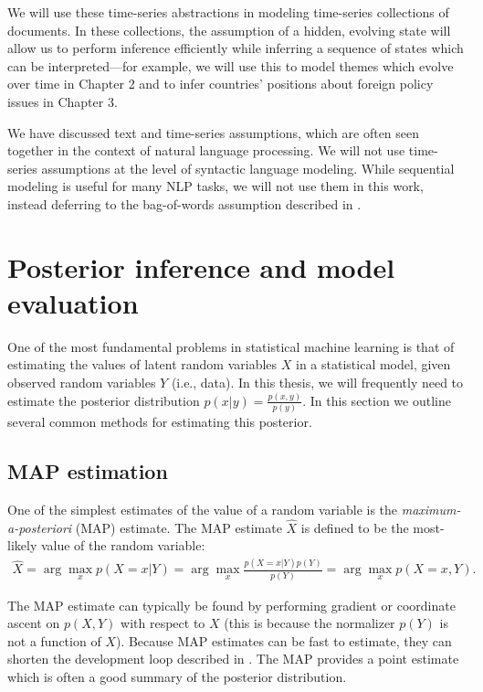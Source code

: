 We will use these time-series abstractions in modeling time-series
collections of documents.  In these collections, the assumption of a
hidden, evolving state will allow us to perform inference efficiently
while inferring a sequence of states which can be interpreted---for
example, we will use this to model themes which evolve over time in
Chapter 2 and to infer countries' positions about foreign policy
issues in Chapter 3.

We have discussed text and time-series assumptions, which are often
seen together in the context of natural language processing.  We will
not use time-series assumptions at the level of syntactic language
modeling.  While sequential modeling is useful for many NLP tasks, we
will not use them in this work, instead deferring to the bag-of-words
assumption described in .


\section{Posterior inference and model evaluation}
One of the most fundamental problems in statistical machine learning
is that of estimating the values of latent random variables $X$ in a
statistical model, given observed random variables $Y$ (i.e., data).
In this thesis, we will frequently need to estimate the posterior distribution
$p(x | y) = \frac{p(x, y)}{p(y)}$.  In this section we outline
several common methods for estimating this posterior.

\subsection{MAP estimation}
One of the simplest estimates of the value of a random variable is the
\emph{maximum-a-posteriori} (MAP) estimate.  The MAP estimate $\hat X$
is defined to be the most-likely value of the random variable:
\begin{align}
  \hat X = \arg \max_x p(X=x | Y) = \arg \max_x \frac{p(X=x | Y) p(Y)}{p(Y)} = \arg \max_x p(X=x, Y).
\end{align}

The MAP estimate can typically be found by performing gradient or
coordinate ascent on $p(X, Y)$ with respect to $X$ (this is because
the normalizer $p(Y)$ is not a function of $X$).  Because MAP
estimates can be fast to estimate, they can shorten the development
loop described in . The MAP provides a point estimate
which is often a good summary of the posterior distribution.

